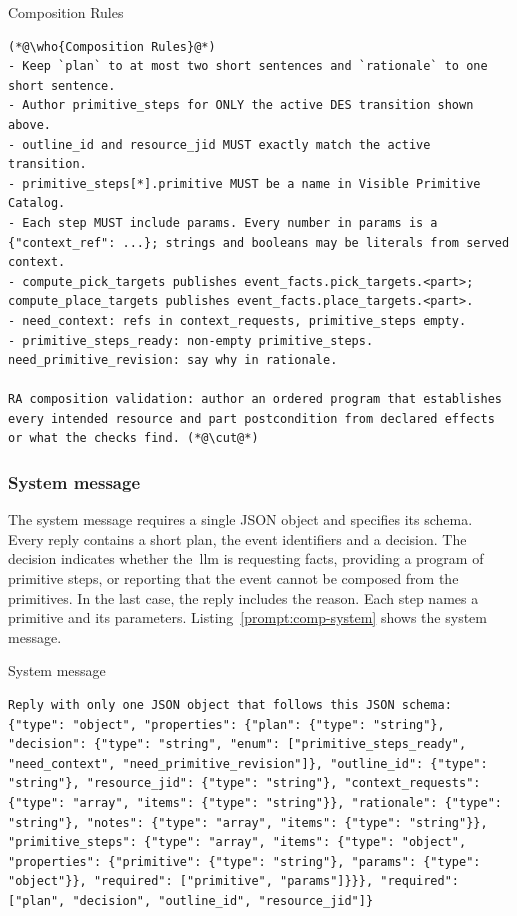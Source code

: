 \begin{recbox}{Composition Rules}
\begin{lstlisting}
(*@\who{Composition Rules}@*)
- Keep `plan` to at most two short sentences and `rationale` to one short sentence.
- Author primitive_steps for ONLY the active DES transition shown above.
- outline_id and resource_jid MUST exactly match the active transition.
- primitive_steps[*].primitive MUST be a name in Visible Primitive Catalog.
- Each step MUST include params. Every number in params is a {"context_ref": ...}; strings and booleans may be literals from served context.
- compute_pick_targets publishes event_facts.pick_targets.<part>; compute_place_targets publishes event_facts.place_targets.<part>.
- need_context: refs in context_requests, primitive_steps empty.
- primitive_steps_ready: non-empty primitive_steps. need_primitive_revision: say why in rationale.

RA composition validation: author an ordered program that establishes every intended resource and part postcondition from declared effects or what the checks find. (*@\cut@*)
\end{lstlisting}
\end{recbox}

\subsubsection{System message}\label{sec:comp-system}

The system message requires a single JSON object and specifies its schema. Every reply contains
a short plan, the event identifiers and a decision. The decision indicates whether the~\gls{llm} is
requesting facts, providing a program of primitive steps, or reporting that the event cannot be
composed from the primitives. In the last case, the reply includes the reason. Each step names a
primitive and its parameters. Listing~\ref{prompt:comp-system} shows the system message.

\begin{recbox}{System message}
\begin{lstlisting}
Reply with only one JSON object that follows this JSON schema:
{"type": "object", "properties": {"plan": {"type": "string"}, "decision": {"type": "string", "enum": ["primitive_steps_ready", "need_context", "need_primitive_revision"]}, "outline_id": {"type": "string"}, "resource_jid": {"type": "string"}, "context_requests": {"type": "array", "items": {"type": "string"}}, "rationale": {"type": "string"}, "notes": {"type": "array", "items": {"type": "string"}}, "primitive_steps": {"type": "array", "items": {"type": "object", "properties": {"primitive": {"type": "string"}, "params": {"type": "object"}}, "required": ["primitive", "params"]}}}, "required": ["plan", "decision", "outline_id", "resource_jid"]}
\end{lstlisting}
\end{recbox}

